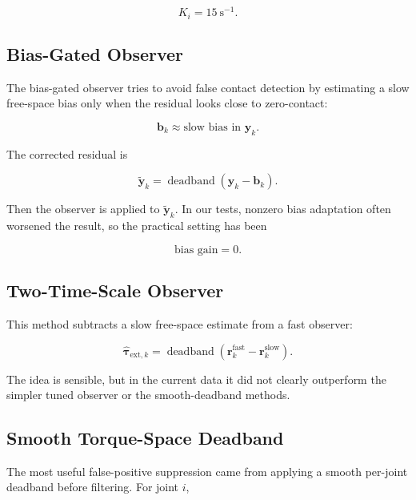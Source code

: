 \documentclass[11pt]{article}
\begin{document}
\begin{equation}
K_i = 15~\mathrm{s}^{-1}.
\end{equation}

\subsection{Bias-Gated Observer}

The bias-gated observer tries to avoid false contact detection by estimating a
slow free-space bias only when the residual looks close to zero-contact:

\begin{equation}
\bm b_k \approx \text{slow bias in } \bm y_k .
\end{equation}

The corrected residual is

\begin{equation}
\tilde{\bm y}_k
= \operatorname{deadband}(\bm y_k - \bm b_k).
\end{equation}

Then the observer is applied to \(\tilde{\bm y}_k\). In our tests, nonzero bias
adaptation often worsened the result, so the practical setting has been

\begin{equation}
\text{bias gain} = 0.
\end{equation}

\subsection{Two-Time-Scale Observer}

This method subtracts a slow free-space estimate from a fast observer:

\begin{equation}
\hat{\bm \tau}_{\mathrm{ext},k}
= \operatorname{deadband}(\bm r^{\mathrm{fast}}_k
- \bm r^{\mathrm{slow}}_k).
\end{equation}

The idea is sensible, but in the current data it did not clearly outperform the
simpler tuned observer or the smooth-deadband methods.

\subsection{Smooth Torque-Space Deadband}

The most useful false-positive suppression came from applying a smooth
per-joint deadband before filtering. For joint \(i\),
\end{document}
